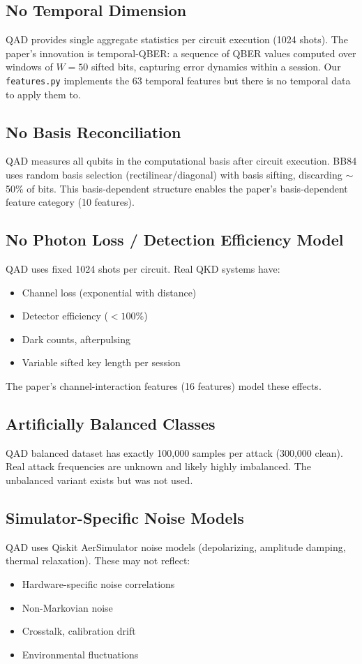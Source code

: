 \subsection{No Temporal Dimension}
QAD provides single aggregate statistics per circuit execution (1024 shots). The paper's innovation is temporal-QBER: a sequence of QBER values computed over windows of $W=50$ sifted bits, capturing error dynamics within a session. Our \texttt{features.py} implements the 63 temporal features but there is no temporal data to apply them to.

\subsection{No Basis Reconciliation}
QAD measures all qubits in the computational basis after circuit execution. BB84 uses random basis selection (rectilinear/diagonal) with basis sifting, discarding $\sim$50\% of bits. This basis-dependent structure enables the paper's basis-dependent feature category (10 features).

\subsection{No Photon Loss / Detection Efficiency Model}
QAD uses fixed 1024 shots per circuit. Real QKD systems have:
\begin{itemize}
    \item Channel loss (exponential with distance)
    \item Detector efficiency ($<100\%$)
    \item Dark counts, afterpulsing
    \item Variable sifted key length per session
\end{itemize}
The paper's channel-interaction features (16 features) model these effects.

\subsection{Artificially Balanced Classes}
QAD balanced dataset has exactly 100,000 samples per attack (300,000 clean). Real attack frequencies are unknown and likely highly imbalanced. The unbalanced variant exists but was not used.

\subsection{Simulator-Specific Noise Models}
QAD uses Qiskit AerSimulator noise models (depolarizing, amplitude damping, thermal relaxation). These may not reflect:
\begin{itemize}
    \item Hardware-specific noise correlations
    \item Non-Markovian noise
    \item Crosstalk, calibration drift
    \item Environmental fluctuations
\end{itemize}

